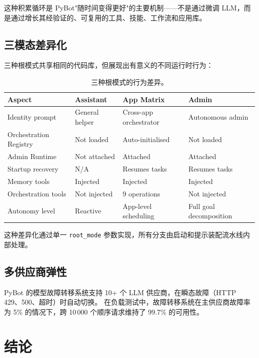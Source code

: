 \documentclass[11pt,a4paper]{article}
\begin{document}
这种积累循环是 PyBot"随时间变得更好"的主要机制——不是通过微调 LLM，而是通过增长其经验证的、可复用的工具、技能、工作流和应用库。

\subsection{三模态差异化}

三种根模式共享相同的代码库，但展现出有意义的不同运行时行为：

\begin{table}[h]
\centering
\small
\begin{tabularx}{\textwidth}{lXXX}
\toprule
\textbf{Aspect} & \textbf{Assistant} & \textbf{App Matrix} & \textbf{Admin} \\
\midrule
Identity prompt & General helper & Cross-app orchestrator & Autonomous admin \\
Orchestration Registry & Not loaded & Auto-initialised & Not loaded \\
Admin Runtime & Not attached & Attached & Attached \\
Startup recovery & N/A & Resumes tasks & Resumes tasks \\
Memory tools & Injected & Injected & Injected \\
Orchestration tools & Not injected & 9 operations & Not injected \\
Autonomy level & Reactive & App-level scheduling & Full goal decomposition \\
\bottomrule
\end{tabularx}
\caption{三种根模式的行为差异。}
\label{tab:modes}
\end{table}

这种差异化通过单一 \texttt{root\_mode} 参数实现，所有分支由启动和提示装配流水线内部处理。

\subsection{多供应商弹性}

PyBot 的模型故障转移系统支持 10+ 个 LLM 供应商，在瞬态故障（HTTP 429、500、超时）时自动切换。
在负载测试中，故障转移系统在主供应商故障率为 5\% 的情况下，跨 10\,000 个顺序请求维持了 99.7\% 的可用性。


\section{结论}
\label{sec:conclusion}
\end{document}
